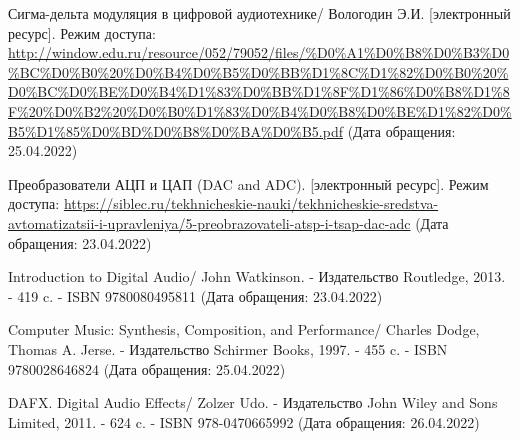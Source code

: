 \documentclass[12pt,a4paper,oneside]{report}
\begin{document}
\begin{thebibliography}{2}
	Сигма-дельта модуляция в цифровой аудиотехнике/ Вологодин Э.И. [электронный ресурс]. Режим доступа: 
	\url{http://window.edu.ru/resource/052/79052/files/%D0%A1%D0%B8%D0%B3%D0%BC%D0%B0%20%D0%B4%D0%B5%D0%BB%D1%8C%D1%82%D0%B0%20%D0%BC%D0%BE%D0%B4%D1%83%D0%BB%D1%8F%D1%86%D0%B8%D1%8F%20%D0%B2%20%D0%B0%D1%83%D0%B4%D0%B8%D0%BE%D1%82%D0%B5%D1%85%D0%BD%D0%B8%D0%BA%D0%B5.pdf}
	(Дата обращения: 25.04.2022)
	
	Преобразователи АЦП и ЦАП (DAC and ADC). [электронный ресурс]. Режим доступа: 
	\url{https://siblec.ru/tekhnicheskie-nauki/tekhnicheskie-sredstva-avtomatizatsii-i-upravleniya/5-preobrazovateli-atsp-i-tsap-dac-adc}
	(Дата обращения: 23.04.2022)
	
	Introduction to Digital Audio/ 
	John Watkinson. - Издательство 
	Routledge, 2013. - 419 c. - ISBN 9780080495811
	(Дата обращения: 23.04.2022)
	
	Computer Music: Synthesis, Composition, and Performance/ 
	Charles Dodge, Thomas A. Jerse. - Издательство 
	Schirmer Books, 1997. - 455 c. - ISBN 9780028646824
	(Дата обращения: 25.04.2022)
	
	DAFX. Digital Audio Effects/ 
	Zolzer Udo. - Издательство 
	John Wiley and Sons Limited, 2011. - 624 c. - ISBN 978-0470665992
	(Дата обращения: 26.04.2022)
	
	
\end{thebibliography}
\end{document}
